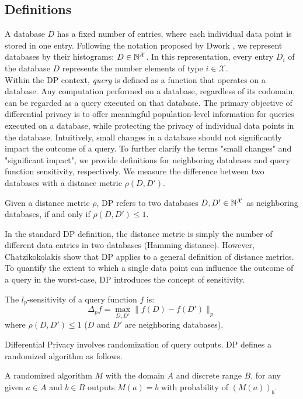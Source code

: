 \subsection{Definitions}\label{subsec:background-dp-definitions}
A database $D$ has a fixed number of entries, where each individual data point is stored in one entry.
Following the notation proposed by Dwork \etal \cite{dwork2014algorithmic}, we represent databases by their histograms: $D \in \mathbb{N}^\mathcal{X}$. 
In this representation, every entry $D_i$ of the database $D$ represents the number elements of type $i \in \mathcal{X}$.
\\  
Within the DP context, \textit{query} is defined as a function that operates on a database. 
Any computation performed on a database, regardless of its codomain, can be regarded as a query executed on that database.
The primary objective of differential privacy is to offer meaningful population-level information for queries executed on a database, while protecting the privacy of individual data points in the database.
Intuitively, small changes in a database should not significantly impact the outcome of a query.
To further clarify the terms "small changes" and "significant impact", we provide definitions for neighboring databases and query function sensitivity, respectively.
We measure the difference between two databases with a distance metric $\rho(D, D')$.
\begin{definition}
  Given a distance metric $\rho$, DP refers to two databases $D, D' \in \mathbb{N}^\mathcal{X}$ as neighboring databases, if and only if $\rho(D, D') \leq 1$.             
\end{definition}
\noindent In the standard DP definition, the distance metric is simply the number of different data entries in two databases (\ie Hamming distance).
However, Chatzikokolakis \etal \cite{chatzikokolakis2013broadening} show that DP applies to a general definition of distance metrics.
To quantify the extent to which a single data point can influence the outcome of a query in the worst-case, DP introduces the concept of sensitivity. 
\begin{definition}[$l_p$-Sensitivity]
  \label{def:norm-sensitivity}
  The $l_p$-sensitivity of a query function $f$ is:
  \begin{equation*}
    \Delta_p f = \max_{D, D'} \|f(D) - f(D')\|_p 
  \end{equation*}
where $\rho(D, D') \leq 1$ (\ie $D$ and $D'$ are neighboring databases).
\end{definition}
\noindent
Differential Privacy involves randomization of query outputs. DP defines a randomized algorithm as follows.
\begin{definition}
  \label{def:randomized-algorithm}
  A randomized algorithm $M$ with the domain $A$ and discrete range $B$, for any given $a \in A$ and $b \in B$ outputs $M(a)= b$ with probability of $(M(a))_b$.
\end{definition}

